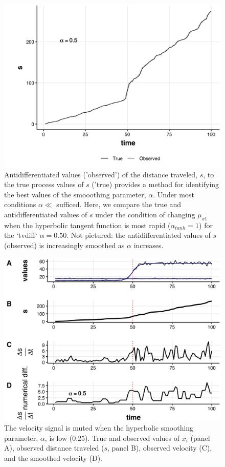 \documentclass[print]{nuthesis}
\begin{document}
\begin{figure}
\includegraphics[width=0.85\linewidth]{.//chapterFiles/velocity/figsCalledInDiss/compareTvdiff_s_changeMuX1_tanhAlpha1-05tvdiffAlpha-1000iter} \caption{Antidifferentiated values ('observed') of the distance traveled, $s$, to the true process values of $s$ ('true) provides a method for identifying the best values of the smooothing parameter, $\alpha$. Under most conditions $\alpha \ll$ sufficed. Here, we compare the true and antidifferentiated values of $s$ under the condition of changing $\mu_{x1}$ when the hyperbolic tangent function is most rapid ($\alpha_{tanh}=1$) for the `tvdiff` $\alpha=0.50$. Not pictured: the antidifferentiated values of $s$ (observed) is increasingly smoothed as $\alpha$ increases.}\label{fig:antiDiffComp}
\end{figure}
\newpage
\begin{figure}
\includegraphics[width=0.85\linewidth]{./chapterFiles/velocity/figsCalledInDiss/changeMuX1_tanhAlpha025-05tvdiffAlpha-1000iter_stackTvdiff} \caption{The velocity signal is muted when the  hyperbolic smoothing parameter, $\alpha$, is low (0.25). True and observed values of $x_i$ (panel A), observed distance traveled ($s$, panel B), observed velocity (C), and the smoothed velocity (D). }\label{fig:mu1varpt25}
\end{figure}
\end{document}
